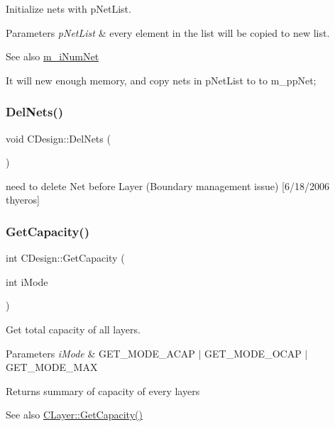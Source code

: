 Initialize nets with p\+Net\+List. 


\begin{DoxyParams}{Parameters}
{\em p\+Net\+List} & every element in the list will be copied to new list. \\
\hline
\end{DoxyParams}
\begin{DoxySeeAlso}{See also}
\mbox{\hyperlink{classCDesign_a8fb5c76e3b7a96e341bbab3083839fed}{m\+\_\+i\+Num\+Net}}
\end{DoxySeeAlso}
It will new enough memory, and copy nets in p\+Net\+List to to m\+\_\+pp\+Net; \mbox{\label{classCDesign_a02442687ac58142d9e5b0a5886ee8285}} 
\subsubsection{\texorpdfstring{DelNets()}{DelNets()}}
{\footnotesize\ttfamily void C\+Design\+::\+Del\+Nets (\begin{DoxyParamCaption}{ }\end{DoxyParamCaption})}

need to delete Net before Layer (Boundary management issue) \mbox{[}6/18/2006 thyeros\mbox{]} \mbox{\label{classCDesign_a5167e124564fd469dbcfbae344c1f6f9}} 
\subsubsection{\texorpdfstring{GetCapacity()}{GetCapacity()}}
{\footnotesize\ttfamily int C\+Design\+::\+Get\+Capacity (\begin{DoxyParamCaption}\item[{int}]{i\+Mode }\end{DoxyParamCaption})}



Get total capacity of all layers. 


\begin{DoxyParams}{Parameters}
{\em i\+Mode} & G\+E\+T\+\_\+\+M\+O\+D\+E\+\_\+\+A\+C\+AP $\vert$ G\+E\+T\+\_\+\+M\+O\+D\+E\+\_\+\+O\+C\+AP $\vert$ G\+E\+T\+\_\+\+M\+O\+D\+E\+\_\+\+M\+AX \\
\hline
\end{DoxyParams}
\begin{DoxyReturn}{Returns}
summary of capacity of every layers 
\end{DoxyReturn}
\begin{DoxySeeAlso}{See also}
\mbox{\hyperlink{classCLayer_a7e041ae4b69adbf606236ce0cd4f35a6}{C\+Layer\+::\+Get\+Capacity()}} 
\end{DoxySeeAlso}
\mbox{\label{classCDesign_a0ea51597e843c1f8f25dbfa4f4d4fa17}} 
